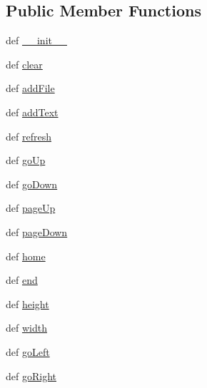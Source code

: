 \subsection*{Public Member Functions}
\begin{DoxyCompactItemize}
\item 
def \hyperlink{classcurseshelpers_1_1MultiText_a092c852947c920b730db515ec8c43900}{\-\_\-\-\_\-init\-\_\-\-\_\-}
\item 
def \hyperlink{classcurseshelpers_1_1MultiText_a9a3d965e98fd46ac82254f98363c6ff1}{clear}
\item 
def \hyperlink{classcurseshelpers_1_1MultiText_afa38c3b3e8bb8a76c64ad84859c7f430}{add\-File}
\item 
def \hyperlink{classcurseshelpers_1_1MultiText_a6c024dd65942dd21afe22b109c129465}{add\-Text}
\item 
def \hyperlink{classcurseshelpers_1_1MultiText_ad1cd0ba7c7f283c27c06b32e190b772d}{refresh}
\item 
def \hyperlink{classcurseshelpers_1_1MultiText_ad29d14ccf9b9fec9e89061058e2546d4}{go\-Up}
\item 
def \hyperlink{classcurseshelpers_1_1MultiText_a083860f56c08911f4e0eb44a4d241c15}{go\-Down}
\item 
def \hyperlink{classcurseshelpers_1_1MultiText_a67e393b4ede829d61ec85d4257f6b8d0}{page\-Up}
\item 
def \hyperlink{classcurseshelpers_1_1MultiText_ab1fbe7b83c53775e513d928a8f0070d7}{page\-Down}
\item 
def \hyperlink{classcurseshelpers_1_1MultiText_af01001c6c256530bd2aadbf1bc0a9020}{home}
\item 
def \hyperlink{classcurseshelpers_1_1MultiText_a8dc0d8b9bc5e97f7a513d577b58125bb}{end}
\item 
def \hyperlink{classcurseshelpers_1_1MultiText_a960a1efde4889ee815554403c828d536}{height}
\item 
def \hyperlink{classcurseshelpers_1_1MultiText_ab0c9d9997fef6ced56114e0fa4cedc04}{width}
\item 
def \hyperlink{classcurseshelpers_1_1BaseElement_a8dad4b03794798c7b6de02554312859f}{go\-Left}
\item 
def \hyperlink{classcurseshelpers_1_1BaseElement_aac34d4e8081c795ff91dd124a997cf2a}{go\-Right}
\end{DoxyCompactItemize}
